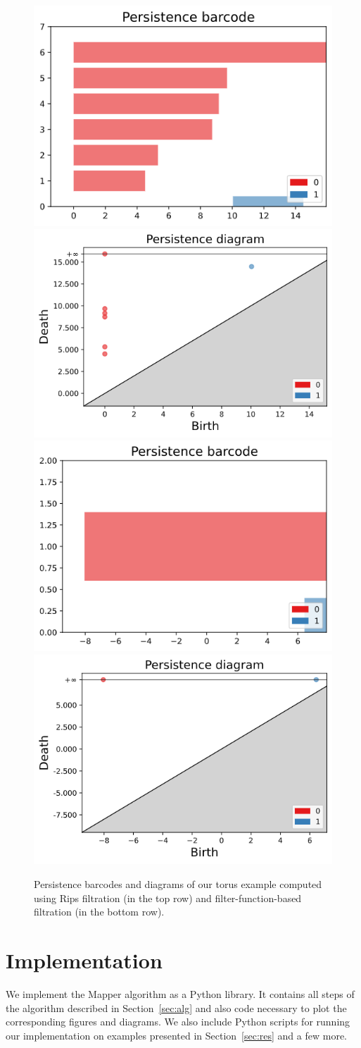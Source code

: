 \documentclass{article}
\begin{document}
\begin{figure}[ht]
    \centering
    \includegraphics[width=0.4\columnwidth]{torus-rips-barcode}
    \includegraphics[width=0.4\columnwidth]{torus-rips-persistence-diagram}
    \includegraphics[width=0.4\columnwidth]{torus-barcode}
    \includegraphics[width=0.4\columnwidth]{torus-persistence-diagram}
    \caption{Persistence barcodes and diagrams of our torus example computed using Rips filtration (in the top row) and filter-function-based filtration (in the bottom row).}
    \label{fig:torus-persistence}
\end{figure}

\section{Implementation}\label{sec:impl}

We implement the Mapper algorithm as a Python library.
It contains all steps of the algorithm described in Section~\ref{sec:alg} and also code necessary to plot the corresponding figures and diagrams.
We also include Python scripts for running our implementation on examples presented in Section~\ref{sec:res} and a few more.
\end{document}
